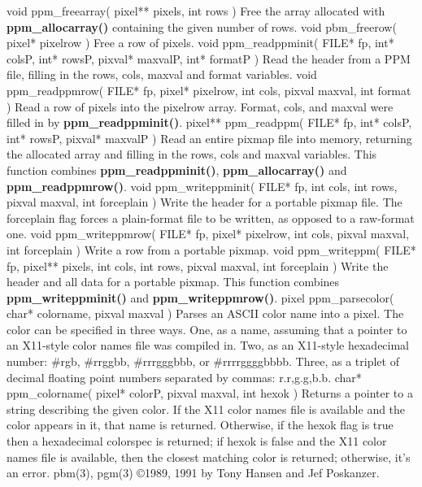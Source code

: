 \Ss
void ppm\_freearray( pixel** pixels, int rows )
\Se
Free the array allocated with
{\bf ppm\_allocarray()}
containing the given number
of rows.
\Ss
void pbm\_freerow( pixel* pixelrow )
\Se
Free a row of pixels.
\Ss
void ppm\_readppminit( FILE* fp, int* colsP, int* rowsP, pixval* maxvalP, int* formatP )
\Se
Read the header from a PPM file, filling in the rows, cols, maxval and format
variables.
\Ss
void ppm\_readppmrow( FILE* fp, pixel* pixelrow, int cols, pixval maxval, int format )
\Se
Read a row of pixels into the pixelrow array.
Format, cols, and maxval were filled in by
{\bf ppm\_readppminit()}{\rm .}
\Ss
pixel** ppm\_readppm( FILE* fp, int* colsP, int* rowsP, pixval* maxvalP )
\Se
Read an entire pixmap file into memory, returning the allocated array and
filling in the rows, cols and maxval variables.
This function combines
{\bf ppm\_readppminit()}{\rm ,}
{\bf ppm\_allocarray()}
and
{\bf ppm\_readppmrow()}{\rm .}
\Ss
void ppm\_writeppminit( FILE* fp, int cols, int rows, pixval maxval, int forceplain )
\Se
Write the header for a portable pixmap file.
The forceplain flag forces a plain-format file to be written, as opposed
to a raw-format one.
\Ss
void ppm\_writeppmrow( FILE* fp, pixel* pixelrow, int cols, pixval maxval, int forceplain )
\Se
Write a row from a portable pixmap.
\Ss
void ppm\_writeppm( FILE* fp, pixel** pixels, int cols, int rows, pixval maxval, int forceplain )
\Se
Write the header and all data for a portable pixmap.
This function combines
{\bf ppm\_writeppminit()}
and
{\bf ppm\_writeppmrow()}{\rm .}
\Ss
pixel ppm\_parsecolor( char* colorname, pixval maxval )
\Se
Parses an ASCII color name into a pixel.
The color can be specified in three ways.  One, as a name, assuming
that a pointer to an X11-style color names file was compiled in.  Two,
as an X11-style hexadecimal number: \#rgb, \#rrggbb, \#rrrgggbbb, or
\#rrrrggggbbbb.  Three, as a triplet of decimal floating point numbers
separated by commas: r.r,g.g,b.b.
\Ss
char* ppm\_colorname( pixel* colorP, pixval maxval, int hexok )
\Se
Returns a pointer to a string describing the given color.
If the X11 color names file is available and the color appears in
it, that name is returned.
Otherwise, if the hexok flag is true then a hexadecimal colorspec
is returned; if hexok is false and the X11 color names file is
available, then the closest matching color is returned;
otherwise, it's an error.
pbm(3), pgm(3)
\copyright 1989, 1991 by Tony Hansen and Jef Poskanzer.
%
 
